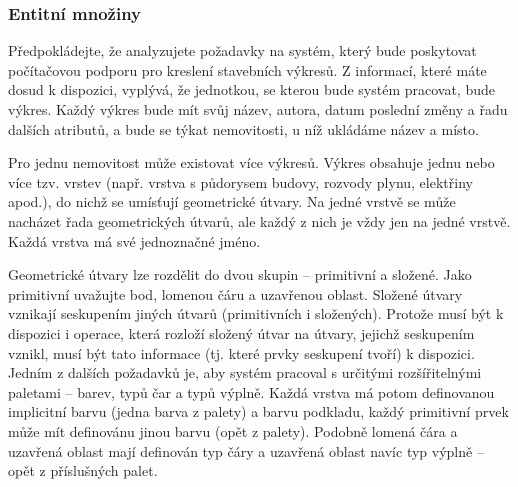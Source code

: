 \documentclass{beamer}
\begin{document}
  \begin{frame}
    \frametitle{Entitní množiny}
      \scriptsize{
      \hspace{0.5cm}Předpokládejte, že analyzujete požadavky na systém, který bude poskytovat počítačovou
      podporu pro kreslení stavebních výkresů. Z informací, které máte dosud k dispozici,
      vyplývá, že jednotkou, se kterou bude systém pracovat, bude \colorbox{blue!30}{výkres}. Každý výkres bude
      mít svůj název, autora, datum poslední změny a řadu dalších atributů, a bude se týkat
      \colorbox{blue!30}{nemovitosti}, u níž ukládáme název a místo.\par


      \hspace{0.5cm}Pro jednu nemovitost může existovat více výkresů. Výkres obsahuje jednu nebo více tzv.
      \colorbox{blue!30}{vrstev} (např. vrstva s půdorysem budovy, rozvody plynu, elektřiny apod.), do nichž se
      umísťují geometrické útvary. Na jedné vrstvě se může nacházet řada \colorbox{blue!30}{geometrických útvarů},
      ale každý z nich je vždy jen na jedné vrstvě. Každá vrstva má své jednoznačné jméno.\par


      \hspace{0.5cm}Geometrické útvary lze rozdělit do dvou skupin -- \colorbox{blue!30}{primitivní} a \colorbox{blue!30}{složené}. Jako primitivní
      uvažujte bod, lomenou čáru a uzavřenou oblast. Složené útvary vznikají seskupením jiných
      útvarů (primitivních i složených). Protože musí být k dispozici i operace, která rozloží
      složený útvar na útvary, jejichž seskupením vznikl, musí být tato informace (tj. které
      prvky seskupení tvoří) k dispozici. Jedním z dalších požadavků je, aby systém pracoval
      s určitými rozšířitelnými \colorbox{blue!30}{paletami} -- barev, typů čar a typů výplně. Každá vrstva má
      potom definovanou implicitní barvu (jedna barva  z  palety) a barvu podkladu, každý
      primitivní prvek může mít definovánu jinou barvu (opět z palety). Podobně lomená čára
      a uzavřená oblast mají definován typ čáry a uzavřená oblast navíc typ výplně – opět
      z příslušných palet.\par}
  \end{frame}
\end{document}
